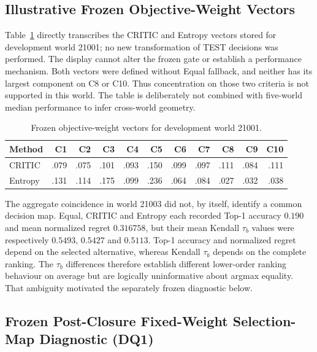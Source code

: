 \documentclass[runningheads,orivec]{llncs}
\begin{document}
\subsection{Illustrative Frozen Objective-Weight Vectors}

Table~\ref{supp:tab:objectivevectors} directly transcribes the CRITIC and Entropy vectors stored
for development world 21001; no new transformation of TEST decisions was performed. The display
cannot alter the frozen gate or establish a performance mechanism. Both vectors were defined
without Equal fallback, and neither has its largest component on C8 or C10. Thus concentration
on those two criteria is not supported in this world. The table is deliberately not combined
with five-world median performance to infer cross-world geometry.

\begin{table}[t]
\centering
\caption{Frozen objective-weight vectors for development world 21001.}
\label{supp:tab:objectivevectors}
\scriptsize
\setlength{\tabcolsep}{2.8pt}
\begin{tabular}{@{}lrrrrrrrrrr@{}}
\toprule
Method & C1 & C2 & C3 & C4 & C5 & C6 & C7 & C8 & C9 & C10\\
\midrule
CRITIC & .079 & .075 & .101 & .093 & .150 & .099 & .097 & .111 & .084 & .111\\
Entropy & .131 & .114 & .175 & .099 & .236 & .064 & .084 & .027 & .032 & .038\\
\bottomrule
\end{tabular}
\end{table}

The aggregate coincidence in world 21003 did not, by itself, identify a common decision map.
Equal, CRITIC and Entropy each recorded Top-1 accuracy $0.190$ and mean normalized regret
$0.316758$, but their mean Kendall $\tau_b$ values were respectively $0.5493$, $0.5427$ and
$0.5113$. Top-1 accuracy and normalized regret depend on the selected alternative, whereas
Kendall $\tau_b$ depends on the complete ranking. The $\tau_b$ differences therefore establish
different lower-order ranking behaviour on average but are logically uninformative about
argmax equality. That ambiguity motivated the separately frozen diagnostic below.

\subsection{Frozen Post-Closure Fixed-Weight Selection-Map Diagnostic (DQ1)}
\label{supp:sec:fixedselection}
\end{document}
